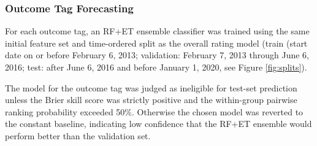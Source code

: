 \subsubsection{Outcome Tag Forecasting}
\label{subsubsub:outcome_tag_forecasting}

For each outcome tag, an RF+ET ensemble classifier was trained using the same initial feature set and time-ordered split as the overall rating model (train (start date on or before February 6, 2013; validation: February 7, 2013 through June 6, 2016; test: after June 6, 2016 and before January 1, 2020, see Figure \ref{fig:splits}). 

The model for the outcome tag was judged as ineligible for test-set prediction unless the Brier skill score was strictly positive and the within-group pairwise ranking probability exceeded 50\%. Otherwise the chosen model was reverted to the constant baseline, indicating low confidence that the RF+ET ensemble would perform better than the validation set.

